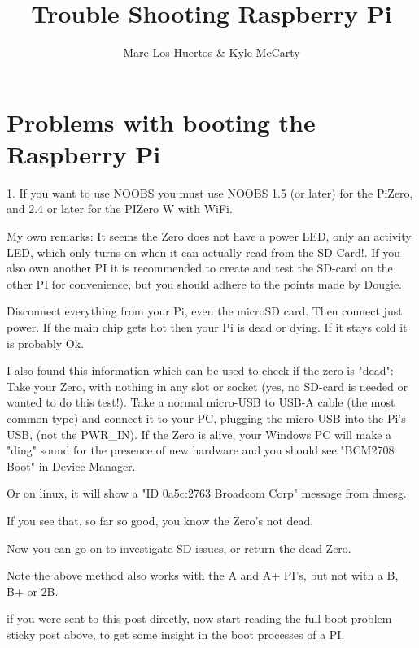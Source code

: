 \documentclass{article}\usepackage[]{graphicx}\usepackage[]{xcolor}
\title{Trouble Shooting Raspberry Pi}
\author{Marc Los Huertos \& Kyle McCarty}
\begin{document}
\maketitle

\section{Problems with booting the Raspberry Pi}

1. If you want to use NOOBS you must use NOOBS 1.5 (or later) for the PiZero, and 2.4 or later for the PIZero W with WiFi.

My own remarks:
It seems the Zero does not have a power LED, only an activity LED, which only turns on when it can actually read from the SD-Card!. If you also own another PI it is recommended to create and test the SD-card on the other PI for convenience, but you should adhere to the points made by Dougie.

Disconnect everything from your Pi, even the microSD card. Then connect just power. If the main chip gets hot then your Pi is dead or dying. If it stays cold it is probably Ok.

I also found this information which can be used to check if the zero is "dead":
Take your Zero, with nothing in any slot or socket (yes, no SD-card is needed or wanted to do this test!). Take a normal micro-USB to USB-A cable (the most common type) and connect it to your PC, plugging the micro-USB into the Pi's USB, (not the PWR\_IN). If the Zero is alive, your Windows PC will make a "ding" sound for the presence of new hardware and you should see "BCM2708 Boot" in Device Manager.

Or on linux, it will show a "ID 0a5c:2763 Broadcom Corp" message from dmesg.

If you see that, so far so good, you know the Zero's not dead.

Now you can go on to investigate SD issues, or return the dead Zero.

Note the above method also works with the A and A+ PI's, but not with a B, B+ or 2B.

if you were sent to this post directly, now start reading the full boot problem sticky post above, to get some insight in the boot processes of a PI.
\end{document}
